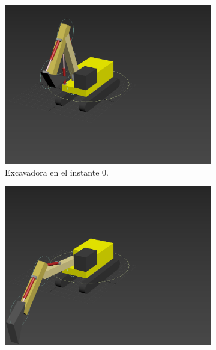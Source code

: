 \begin{figure}[H]
    \centering 
	\begin{subfigure}[t]{0.48\textwidth}
	    \centering
	    \includegraphics[width=\textwidth]{imagenes/animacion/0.png}
        \caption{Excavadora en el instante 0.}
    \end{subfigure}
    \hfill
	\begin{subfigure}[t]{0.48\textwidth}
	    \centering
	    \includegraphics[width=\textwidth]{imagenes/animacion/40.png}

\end{subfigure}
\end{figure}

